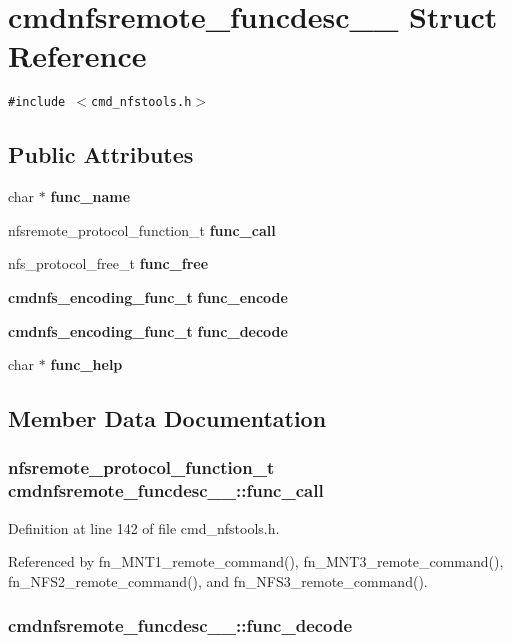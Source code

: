 \section{cmdnfsremote\_\-funcdesc\_\-\_\- Struct Reference}
\label{structcmdnfsremote__funcdesc____}
{\tt \#include $<$cmd\_\-nfstools.h$>$}

\subsection*{Public Attributes}
\begin{CompactItemize}
\item 
char $\ast$ {\bf func\_\-name}
\item 
nfsremote\_\-protocol\_\-function\_\-t {\bf func\_\-call}
\item 
nfs\_\-protocol\_\-free\_\-t {\bf func\_\-free}
\item 
{\bf cmdnfs\_\-encoding\_\-func\_\-t} {\bf func\_\-encode}
\item 
{\bf cmdnfs\_\-encoding\_\-func\_\-t} {\bf func\_\-decode}
\item 
char $\ast$ {\bf func\_\-help}
\end{CompactItemize}


\subsection{Member Data Documentation}
\subsubsection{\setlength{\rightskip}{0pt plus 5cm}nfsremote\_\-protocol\_\-function\_\-t {\bf cmdnfsremote\_\-funcdesc\_\-\_\-::func\_\-call}}\label{structcmdnfsremote__funcdesc_____o1}




Definition at line 142 of file cmd\_\-nfstools.h.

Referenced by fn\_\-MNT1\_\-remote\_\-command(), fn\_\-MNT3\_\-remote\_\-command(), fn\_\-NFS2\_\-remote\_\-command(), and fn\_\-NFS3\_\-remote\_\-command().
\subsubsection{ {\bf cmdnfsremote\_\-funcdesc\_\-\_\-::func\_\-decode}}\label{structcmdnfsremote__funcdesc_____o4}




